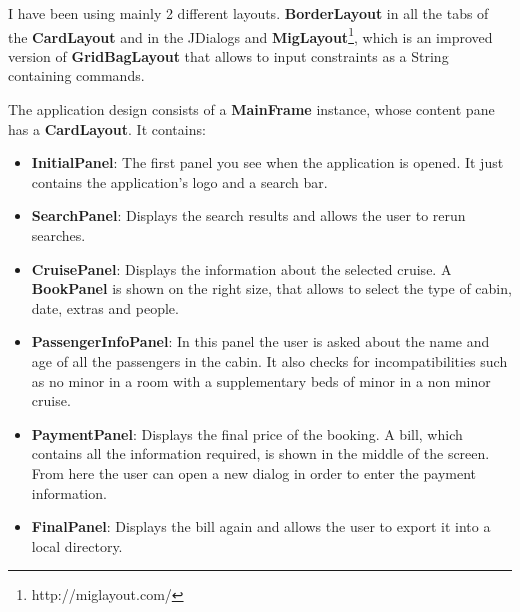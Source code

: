 \documentclass{article}
\begin{document}
   I have been using mainly 2 different layouts. \textbf{BorderLayout} in all the tabs of the \textbf{CardLayout} and in the JDialogs and \textbf{MigLayout}\footnote{http://miglayout.com/}, which is an improved  version of \textbf{GridBagLayout} that allows to input constraints as a String containing commands.
   
   The application design consists of a \textbf{MainFrame} instance, whose content pane has a \textbf{CardLayout}. It contains:
   \begin{itemize}
	   \item \textbf{InitialPanel}: The first panel you see when the application is opened. It just contains the application's logo and a search bar.
   	   \item \textbf{SearchPanel}: Displays the search results and allows the user to rerun searches.
	   \item \textbf{CruisePanel}: Displays the information about the selected cruise. A \textbf{BookPanel} is shown on the right size, that allows to select the type of cabin, date, extras and people.
   	   \item \textbf{PassengerInfoPanel}: In this panel the user is asked about the name and age of all the passengers in the cabin. It also checks for incompatibilities such as no minor in a room with a supplementary beds of minor in a non minor cruise.
   	   \item \textbf{PaymentPanel}: Displays the final price of the booking. A bill, which contains all the information required, is shown in the middle of the screen. From here the user can open a new dialog in order to enter the payment information.
   	   \item \textbf{FinalPanel}: Displays the bill again and allows the user to export it into a local directory.
   \end{itemize}   
   
\end{document}
